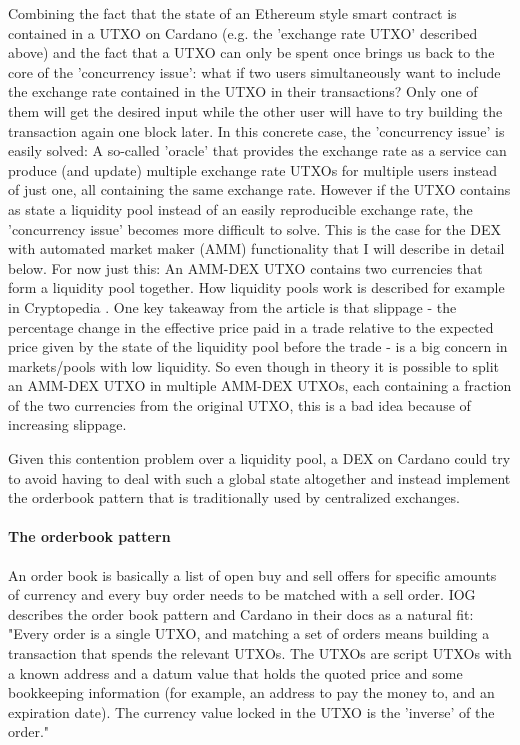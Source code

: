 \documentclass[a4paper,twoside,12pt]{report}
\begin{document}
Combining the fact that the state of an Ethereum style smart contract is contained in a UTXO on Cardano (e.g. the 'exchange rate UTXO' described above) and the fact that a UTXO can only be spent once brings us back to the core of the 'concurrency issue': what if two users simultaneously want to include the exchange rate contained in the UTXO in their transactions? Only one of them will get the desired input while the other user will have to try building the transaction again one block later. In this concrete case, the 'concurrency issue' is easily solved: A so-called 'oracle' that provides the exchange rate as a service can produce (and update) multiple exchange rate UTXOs for multiple users instead of just one, all containing the same exchange rate.
However if the UTXO contains as state a liquidity pool instead of an easily reproducible exchange rate, the 'concurrency issue' becomes more difficult to solve. This is the case for the DEX with automated market maker (AMM) functionality that I will describe in detail below. For now just this: An AMM-DEX UTXO contains two currencies that form a liquidity pool together. How liquidity pools work is described for example in Cryptopedia \cite{cryptopediaAMM}. One key takeaway from the article is that slippage - the percentage change in the effective price paid in a trade relative to the expected price given by the state of the liquidity pool before the trade - is a big concern in markets/pools with low liquidity. So even though in theory it is possible to split an AMM-DEX UTXO in multiple AMM-DEX UTXOs, each containing a fraction of the two currencies from the original UTXO, this is a bad idea because of increasing slippage. 

Given this contention problem over a liquidity pool, a DEX on Cardano could try to avoid having to deal with such a global state altogether and instead implement the orderbook pattern that is traditionally used by centralized exchanges. 

\paragraph{The orderbook pattern}

An order book is basically a list of open buy and sell offers for specific amounts of currency and every buy order needs to be matched with a sell order. IOG describes the order book pattern and Cardano in their docs \cite{iogOrderBook} as a natural fit: "Every order is a single UTXO, and matching a set of orders means building a transaction that spends the relevant UTXOs. The UTXOs are script UTXOs with a known address and a datum value that holds the quoted price and some bookkeeping information (for example, an address to pay the money to, and an expiration date). The currency value locked in the UTXO is the 'inverse' of the order."
\end{document}
